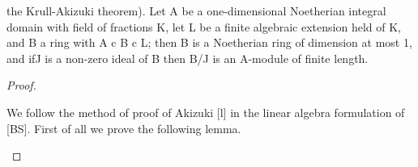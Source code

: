 \begin{theorem}[Theorem 11.7]\label{mcrt-auto-theorem-11-7}\uses{}
\begin{mathematicalrecord}
the Krull-Akizuki    theorem). Let A be a one-dimensional
Noetherian integral domain with field of fractions K, let L be a finite
algebraic extension held of K, and B a ring with A c B c L; then B is a
Noetherian ring of dimension at most 1, and ifJ is a non-zero ideal of B then
B/J is an A-module of finite length.
\end{mathematicalrecord}
\end{theorem}
\begin{proof}
\begin{mathematicalrecord}
We follow the method of proof of Akizuki [l] in the linear algebra
formulation of [BS]. First of all we prove the following lemma.
\end{mathematicalrecord}
\end{proof}


